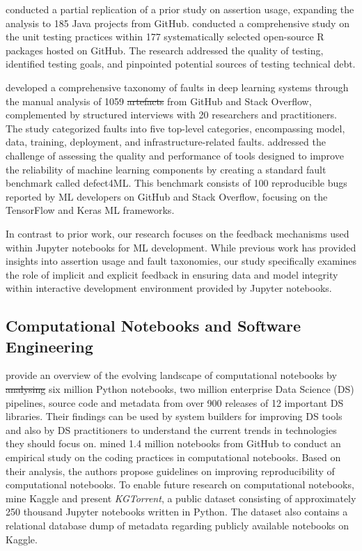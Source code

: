 \documentclass[smallextended]{svjour3}       %
\providecommand{\DIFadd}[1]{{\protect\color{blue}\uwave{#1}}} %
\providecommand{\DIFdel}[1]{{\protect\color{red}\sout{#1}}} %
\providecommand{\DIFaddbegin}{} %
\providecommand{\DIFaddend}{} %
\providecommand{\DIFdelbegin}{} %
\providecommand{\DIFdelend}{} %
\newcommand{\DIFscaledelfig}{0.5}
\newlength{\DIFdelgraphicswidth} %
\newlength{\DIFdelgraphicsheight} %
\newcommand{\DIFaddincludegraphics}[2][]{{\color{blue}\fbox{\DIFOincludegraphics[#1]{#2}}}} %
\newcommand{\DIFdelincludegraphics}[2][]{%
\sbox{\DIFdelgraphicsbox}{\DIFOincludegraphics[#1]{#2}}%
\settoboxwidth{\DIFdelgraphicswidth}{\DIFdelgraphicsbox} %
\settoboxtotalheight{\DIFdelgraphicsheight}{\DIFdelgraphicsbox} %
\scalebox{\DIFscaledelfig}{%
\parbox[b]{\DIFdelgraphicswidth}{\usebox{\DIFdelgraphicsbox}\\[-\baselineskip] \rule{\DIFdelgraphicswidth}{0em}}\llap{\resizebox{\DIFdelgraphicswidth}{\DIFdelgraphicsheight}{%
\setlength{\unitlength}{\DIFdelgraphicswidth}%
\begin{picture}(1,1)%
\thicklines\linethickness{2pt} %
{\color[rgb]{1,0,0}\put(0,0){\framebox(1,1){}}}%
{\color[rgb]{1,0,0}\put(0,0){\line( 1,1){1}}}%
{\color[rgb]{1,0,0}\put(0,1){\line(1,-1){1}}}%
\end{picture}%
}\hspace*{3pt}}} %
} %
\DeclareRobustCommand{\DIFaddbegin}{\DIFOaddbegin \let\includegraphics\DIFaddincludegraphics} %
\DeclareRobustCommand{\DIFaddend}{\DIFOaddend \let\includegraphics\DIFOincludegraphics} %
\DeclareRobustCommand{\DIFdelbegin}{\DIFOdelbegin \let\includegraphics\DIFdelincludegraphics} %
\DeclareRobustCommand{\DIFdelend}{\DIFOaddend \let\includegraphics\DIFOincludegraphics} %
\begin{document}
\citet{kochhar2017revisiting} conducted a partial replication of a prior study on assertion usage, expanding the analysis to 185 Java projects from GitHub. \citet{vidoni2021evaluating} conducted a comprehensive study on the unit testing practices within 177 systematically selected open-source R packages hosted on GitHub. The research addressed the quality of testing, identified testing goals, and pinpointed potential sources of testing technical debt.

\citet{humbatova2020taxonomy} developed a comprehensive taxonomy of faults in deep learning systems through the manual analysis of 1059 \DIFdelbegin \DIFdel{artefacts }\DIFdelend \DIFaddbegin \DIFadd{artifacts }\DIFaddend from GitHub and Stack Overflow, complemented by structured interviews with 20 researchers and practitioners. The study categorized faults into five top-level categories, encompassing model, data, training, deployment, and infrastructure-related faults. \citet{morovati2023bugs} addressed the challenge of assessing the quality and performance of tools designed to improve the reliability of machine learning components by creating a standard fault benchmark called defect4ML. This benchmark consists of 100 reproducible bugs reported by ML developers on GitHub and Stack Overflow, focusing on the TensorFlow and Keras ML frameworks.

In contrast to prior work, our research focuses on the feedback mechanisms used within Jupyter notebooks for ML development. While previous work has provided insights into assertion usage and fault taxonomies, our study specifically examines the role of implicit and explicit feedback in ensuring data and model integrity within interactive development environment provided by Jupyter notebooks.

\subsection{Computational Notebooks and Software Engineering}\label{sec:notebooks}

\citet{psallidas2019data} provide an overview of the evolving landscape of computational notebooks by \DIFdelbegin \DIFdel{analysing }\DIFdelend \DIFaddbegin \DIFadd{analyzing }\DIFaddend six million Python notebooks, two million enterprise Data Science (DS) pipelines, source code and metadata from over 900 releases of 12 important DS libraries. Their findings can be used by system builders for improving DS tools and also by DS practitioners to understand the current trends in technologies they should focus on. \citet{pimentel2019large-scale} mined 1.4 million notebooks from GitHub to conduct an empirical study on the coding practices in computational notebooks. Based on their analysis, the authors propose guidelines on improving reproducibility of computational notebooks. To enable future research on computational notebooks, \citet{quaranta2021kgtorrent} mine Kaggle and present \textit{KGTorrent}, a public dataset consisting of approximately 250 thousand Jupyter notebooks written in Python. The dataset also contains a relational database dump of metadata regarding publicly available notebooks on Kaggle.
\end{document}
